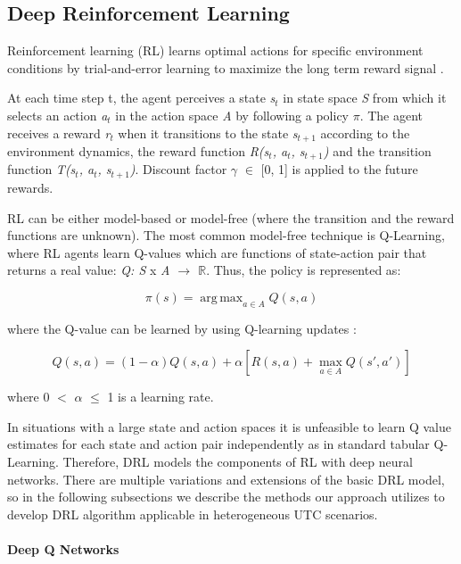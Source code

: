 \documentclass{llncs}
\DeclareMathOperator*{\argmax}{arg\,max}
\begin{document}
\subsection{Deep Reinforcement Learning}

Reinforcement learning (RL) learns optimal actions for specific environment conditions by trial-and-error learning to maximize the long term reward signal \cite{RichardS.SuttonandAndrewG.Barto2018}.

At each time step t, the agent perceives a state \textit{s$_{t}$} in state space \textit{S} from which it selects an action \textit{a$_{t}$} in the action space \textit{A} by following a policy \textit{$\pi$}. The agent receives a reward \textit{r$_{t}$} when it transitions to the state \textit{s$_{t+1}$} according to the environment dynamics, the reward function  \textit{R(s$_{t}$, a$_{t}$, s$_{t+1}$)} and the transition function \textit{T(s$_{t}$, a$_{t}$, s$_{t+1}$)}. Discount factor $\gamma$ $\in$ [0, 1] is applied to the future rewards.

RL can be either model-based or model-free (where the transition and the reward functions are unknown). The most common model-free technique is Q-Learning, where RL agents learn Q-values which are functions of state-action pair that returns a real value: \textit{Q: S} x \textit{A $\rightarrow$ $\mathbb{R}$}. Thus, the policy is represented as:

\begin{equation}
\pi(s) = \argmax_{a \in A} Q(s, a)
\end{equation}

where the Q-value can be learned by using Q-learning updates \cite{Watkins1992}:

\begin{equation}
Q(s, a) = (1 - \alpha)Q(s, a) + \alpha[R(s, a) + \max_{a \in A}Q(s', a')]
\end{equation}

where 0 $<$ $\alpha$ $\leq$ 1 is a learning rate.

In situations with a large state and action spaces it is unfeasible to learn Q value estimates for each state and action pair independently as in standard tabular Q-Learning. Therefore, DRL models the components of RL with deep neural networks. There are multiple variations and extensions of the basic DRL model, so in the following subsections we describe the methods our approach utilizes to develop DRL algorithm applicable in heterogeneous UTC scenarios. 

\paragraph{\textbf{Deep Q Networks}}
\end{document}
